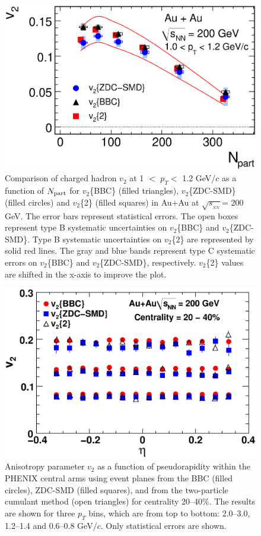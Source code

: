 \documentclass[aps,prc,superscriptaddress,showpacs,floatfix,twocolumn]{revtex4}
\newcommand \gevc{GeV/$c$\xspace}
\newcommand \pt{\mbox{$p_T$}\xspace}
\newcommand \Np{\mbox{$N_{\rm part}$}\xspace}
\newcommand \sqsn{\mbox{$\sqrt{s_{_{NN}}}$}\xspace}
\newcommand \Au{{Au+Au}\xspace}
\begin{document}
\begin{figure}[htb!]
\includegraphics[width=0.55\linewidth]{v2npart_zdc-smd_bbc_cumulants.eps}
\caption{\label{fig:v2npart_zdc-smd_bbc_cumulants.eps}
Comparison of charged hadron $v_2$ at 1 $<$ \pt $<$ 1.2 \gevc as a function of \Np for 
$v_2$\{BBC\} (filled triangles),  $v_2$\{ZDC-SMD\} (filled circles) and $v_2$\{2\} (filled squares) 
in \Au at \sqsn = 200 GeV. The error bars represent statistical errors. The open boxes represent 
type B systematic uncertainties on $v_2$\{BBC\} and $v_2$\{ZDC-SMD\}. Type B systematic 
uncertainties on $v_2$\{2\} are represented by solid red lines. The gray and blue bands represent 
type C systematic errors on $v_2$\{BBC\} and $v_2$\{ZDC-SMD\}, respectively.  $v_2$\{2\} values 
are shifted in the x-axis to improve the plot.
}
\end{figure}

\begin{figure}[hbt!]
\includegraphics[width=0.55\linewidth]{v2vseta_20-40_3methods.eps}
\caption{\label{fig:v2vseta_20-40_3methods.eps} Anisotropy parameter $v_2$ 
as a function of pseudorapidity within the PHENIX central arms using event 
planes from the BBC (filled circles), ZDC-SMD (filled squares), and from 
the two-particle cumulant method (open triangles) for centrality 20--40\%. 
The results are shown for three \pt bins, which are from top to bottom: 
2.0--3.0, 1.2--1.4 and 0.6--0.8 \gevc.  Only statistical errors are shown.
}
\end{figure}
\end{document}
